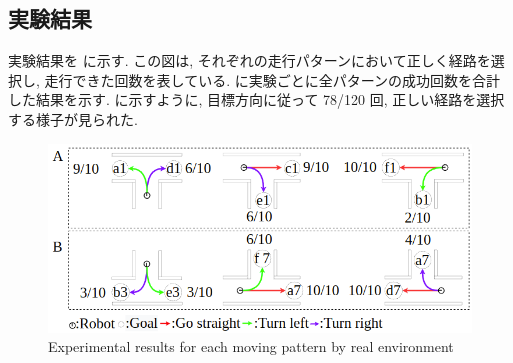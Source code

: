 \subsection{実験結果}
実験結果を  に示す. この図は, それぞれの走行パターンにおいて正しく経路を選択し, 走行できた回数を表している.  に実験ごとに全パターンの成功回数を合計した結果を示す.  に示すように, 目標方向に従って 78/120 回, 正しい経路を選択する様子が見られた.

\begin{figure}[hbtp]
  \centering
 \includegraphics[keepaspectratio, scale=0.45]
      {images/real_result.png}
 \caption{Experimental results for each moving pattern by real environment}
 \label{Fig:real_result}
\end{figure}


\vspace{-0.7cm}

